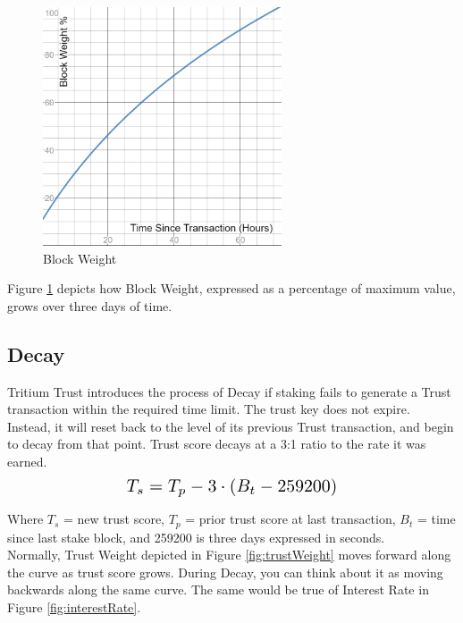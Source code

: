 \documentclass[11pt]{article}
\begin{document}
\begin{figure}[h!]
    \centering
    \includegraphics[width=0.63\textwidth]{images/blockWeight.png}
    \caption{Block Weight \label{fig:blockWeight}}
\end{figure}

\noindent Figure \ref{fig:blockWeight} depicts how Block Weight, expressed as a percentage of maximum value, grows over three days of time.\\

\subsection{Decay}
Tritium Trust introduces the process of Decay if staking fails to generate a Trust transaction within the required time limit. The trust key does not expire. Instead, it will reset back to the level of its previous Trust transaction, and begin to decay from that point. Trust score decays at a 3:1 ratio to the rate it was earned.\\
\begin{equation}
\resizebox{.50\hsize}{!}{$T_s = T_p - 3 \cdot (B_t - 259200)$}
\end{equation}

\noindent Where $T_s$ = new trust score, $T_p$ = prior trust score at last transaction, $B_t$ = time since last stake block, and 259200 is three days expressed in seconds.\\

\noindent Normally, Trust Weight depicted in Figure \ref{fig:trustWeight} moves forward along the curve as trust score grows. During Decay, you can think about it as moving backwards along the same curve. The same would be true of Interest Rate in Figure \ref{fig:interestRate}. \\
\end{document}
